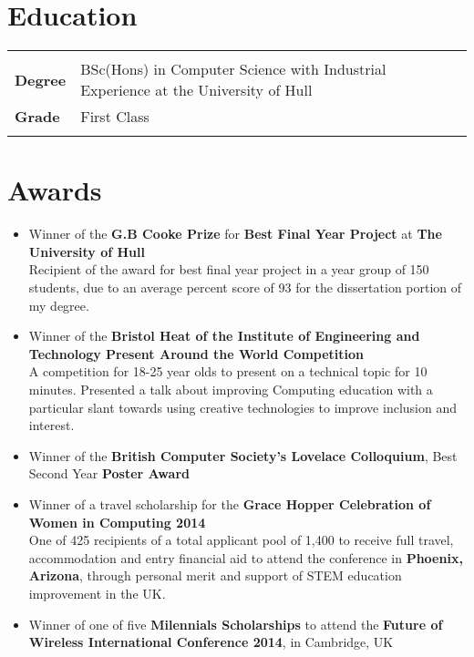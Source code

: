 \documentclass{article}
\begin{document}
\begin{flushleft}
\section*{Education}
\begin{tabular}{@{}ll@{}}
    \multicolumn{2}{l}{}\\
    \textbf{Degree} &BSc(Hons) in Computer Science with Industrial Experience at the University of Hull  \\
    \textbf{Grade} &First Class   \\
    &\\
\end{tabular}

\section*{Awards}
\begin{itemize}
\item Winner of the \textbf{G.B Cooke Prize} for \textbf{Best Final Year Project} at \textbf{The University of Hull}\\
\small Recipient of the award for best final year project in a year group of 150 students, due to an average percent score of 93 for the dissertation portion of my degree. 
\item Winner of the \textbf{Bristol Heat of the Institute of Engineering and Technology Present Around the World Competition} \\
\small A competition for 18-25 year olds to present on a technical topic for 10 minutes. Presented a talk about improving Computing education with a particular slant towards using creative technologies to improve inclusion and interest.
\item \normalsize Winner of the \textbf{British Computer Society's Lovelace Colloquium}, Best Second Year \textbf{Poster Award}
\item Winner of a travel scholarship for the \textbf{Grace Hopper Celebration of Women in Computing 2014}\\
 \small One of 425 recipients of a total applicant pool of 1,400 to receive full travel,  accommodation and entry financial aid to attend the conference in \textbf{Phoenix, Arizona}, through personal merit and support of STEM education improvement in the UK.
\item \normalsize Winner of one of five \textbf{Milennials Scholarships} to attend the \textbf{Future of Wireless International Conference 2014}, in Cambridge, UK 
\end{itemize}



\end{flushleft}
\end{document}
